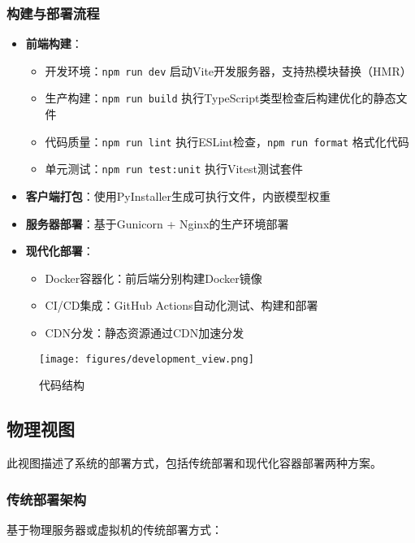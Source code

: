 \documentclass[a4paper,12pt]{article}
\begin{document}
\subsubsection{构建与部署流程}
\begin{itemize}
  \item \textbf{前端构建}：
    \begin{itemize}
      \item 开发环境：\texttt{npm run dev} 启动Vite开发服务器，支持热模块替换（HMR）
      \item 生产构建：\texttt{npm run build} 执行TypeScript类型检查后构建优化的静态文件
      \item 代码质量：\texttt{npm run lint} 执行ESLint检查，\texttt{npm run format} 格式化代码
      \item 单元测试：\texttt{npm run test:unit} 执行Vitest测试套件
    \end{itemize}
  \item \textbf{客户端打包}：使用PyInstaller生成可执行文件，内嵌模型权重
  \item \textbf{服务器部署}：基于Gunicorn + Nginx的生产环境部署
  \item \textbf{现代化部署}：
    \begin{itemize}
      \item Docker容器化：前后端分别构建Docker镜像
      \item CI/CD集成：GitHub Actions自动化测试、构建和部署
      \item CDN分发：静态资源通过CDN加速分发
    \end{itemize}
\end{itemize}

\begin{figure}[h]
  \centering
  \texttt{[image: figures/development\_view.png]}
  \caption{代码结构}
  \label{fig:development_view}
\end{figure}

\subsection{物理视图}
此视图描述了系统的部署方式，包括传统部署和现代化容器部署两种方案。

\subsubsection{传统部署架构}
基于物理服务器或虚拟机的传统部署方式：
\end{document}
